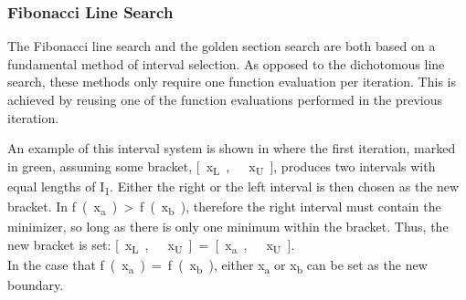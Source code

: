 \subsubsection{Fibonacci Line Search}The Fibonacci line search and the golden section search are both based on a fundamental method of interval selection. As opposed to the dichotomous line search, these methods only require one function evaluation per iteration. This is achieved by reusing one of the function evaluations performed in the previous iteration.\cite{AAntoniou}

An example of this interval system is shown in  where the first iteration, marked in green, assuming some bracket, \si{[x_{L},\ x_{U}]}, produces two intervals with equal lengths of \si{I_1}. Either the right or the left interval is then chosen as the new bracket. In  \si{f(x_a) > f(x_b)}, therefore the right interval must contain the minimizer, so long as there is only one minimum within the bracket. Thus, the new bracket is set: \si{[x_{L},\ x_{U}] = \si{[x_{a},\ x_{U}]}}.\\
In the case that \si{f(x_a) = f(x_b)}, either \si{x_a} or \si{x_b} can be set as the new boundary.


